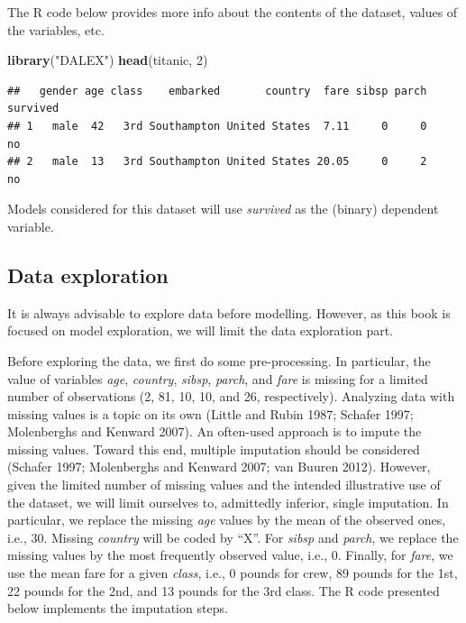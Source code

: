 \documentclass[]{krantz}
\newenvironment{Shaded}{\begin{snugshade}}{\end{snugshade}}
\newcommand{\DecValTok}[1]{\textcolor[rgb]{0.00,0.00,0.81}{#1}}
\newcommand{\KeywordTok}[1]{\textcolor[rgb]{0.13,0.29,0.53}{\textbf{#1}}}
\newcommand{\NormalTok}[1]{#1}
\newcommand{\StringTok}[1]{\textcolor[rgb]{0.31,0.60,0.02}{#1}}
\begin{document}
The R code below provides more info about the contents of the dataset, values of the variables, etc.

\begin{Shaded}
\begin{Highlighting}[]
\KeywordTok{library}\NormalTok{(}\StringTok{"DALEX"}\NormalTok{)}
\KeywordTok{head}\NormalTok{(titanic, }\DecValTok{2}\NormalTok{)}
\end{Highlighting}
\end{Shaded}

\begin{verbatim}
##   gender age class    embarked       country  fare sibsp parch survived
## 1   male  42   3rd Southampton United States  7.11     0     0       no
## 2   male  13   3rd Southampton United States 20.05     0     2       no
\end{verbatim}

Models considered for this dataset will use \emph{survived} as the (binary) dependent variable.

\hypertarget{exploration-titanic}{%
\subsection{Data exploration}\label{exploration-titanic}}

It is always advisable to explore data before modelling. However, as this book is focused on model exploration, we will limit the data exploration part.

Before exploring the data, we first do some pre-processing. In particular, the value of variables \emph{age}, \emph{country}, \emph{sibsp}, \emph{parch}, and \emph{fare} is missing for a limited number of observations (2, 81, 10, 10, and 26, respectively). Analyzing data with missing values is a topic on its own (Little and Rubin 1987; Schafer 1997; Molenberghs and Kenward 2007). An often-used approach is to impute the missing values. Toward this end, multiple imputation should be considered (Schafer 1997; Molenberghs and Kenward 2007; van Buuren 2012). However, given the limited number of missing values and the intended illustrative use of the dataset, we will limit ourselves to, admittedly inferior, single imputation. In particular, we replace the missing \emph{age} values by the mean of the observed ones, i.e., 30. Missing \emph{country} will be coded by ``X''. For \emph{sibsp} and \emph{parch}, we replace the missing values by the most frequently observed value, i.e., 0. Finally, for \emph{fare}, we use the mean fare for a given \emph{class}, i.e., 0 pounds for crew, 89 pounds for the 1st, 22 pounds for the 2nd, and 13 pounds for the 3rd class. The R code presented below implements the imputation steps.
\end{document}
